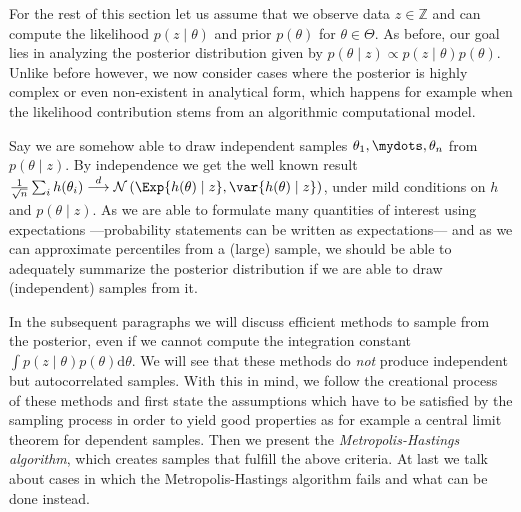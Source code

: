 For the rest of this section let us assume that we observe data $z \in \mathbb{Z}$ and can compute the likelihood $p(z \mid \theta)$ and prior $p(\theta)$ for $\theta \in \Theta$.
As before, our goal lies in analyzing the posterior distribution given by $p(\theta \mid z) \propto p(z \mid \theta) p(\theta)$.
Unlike before however, we now consider cases where the posterior is highly complex or even non-existent in analytical form, which happens for example when the likelihood contribution stems from an algorithmic computational model.

Say we are somehow able to draw independent samples $\theta_1, \mydots, \theta_n$ from $p(\theta \mid z)$.
By independence we get the well known result $\frac{1}{\sqrt{n}} \sum_i h(\theta_i) \overset{d}{\longrightarrow} \mathcal{N} \left( \Exp{h(\theta) \mid z}, \var{h(\theta) \mid z} \right)$, under mild conditions on $h$ and $p(\theta \mid z)$.
As we are able to formulate many quantities of interest using expectations ---probability statements can be written as expectations--- and as we can approximate percentiles from a (large) sample, we should be able to adequately summarize the posterior distribution if we are able to draw (independent) samples from it.

In the subsequent paragraphs we will discuss efficient methods to sample from the posterior, even if we cannot compute the integration constant $\int p(z \mid \theta) p(\theta) \mathrm{d}\theta$.
We will see that these methods do \emph{not} produce independent but autocorrelated samples.
With this in mind, we follow the creational process of these methods and first state the assumptions which have to be satisfied by the sampling process in order to yield good properties as for example a central limit theorem for dependent samples.
Then we present the \emph{Metropolis-Hastings algorithm}, which creates samples that fulfill the above criteria.
At last we talk about cases in which the Metropolis-Hastings algorithm fails and what can be done instead.

